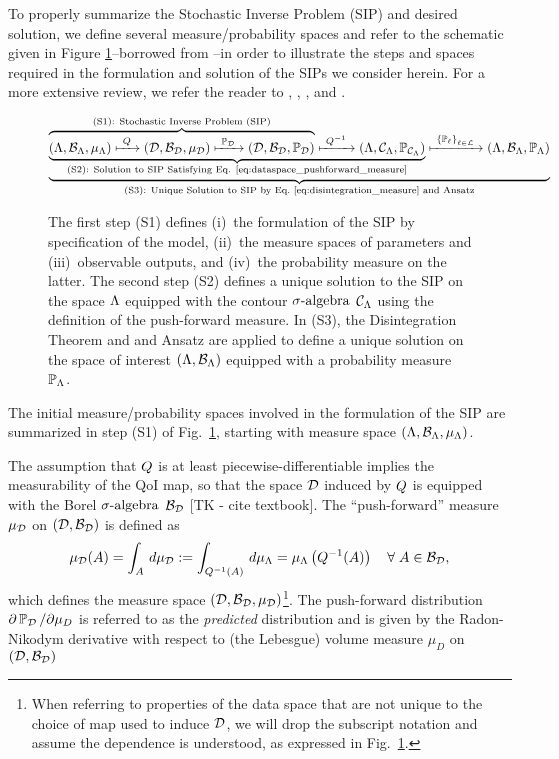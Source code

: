 To properly summarize the Stochastic Inverse Problem (SIP) and desired solution, we define several measure/probability spaces and refer to the schematic given in Figure \ref{fig:scheme}\---borrowed from \cite{BM17}\---in order to illustrate the steps and spaces required in the formulation and solution of the SIPs we consider herein.
For a more extensive review, we refer the reader to \cite{BBE11}, \cite{BES12}, \cite{BET+14}, and \cite{BM17}.

\begin{figure}[!h]
\begin{equation}
\underbrace{
\underbrace{
\overbrace{
 ({\Lambda}, \mathcal{B}_{{\Lambda}}, \mu_{{\Lambda}}) \xmapsto{\  Q\ } (\mathcal{D}, \mathcal{B}_{\mathcal{D}}, \mu_{\mathcal{D}})
  \xmapsto{\ \operatorname*{\mathbb{P}_{\mathcal{D}}}\ } (\mathcal{D}, \mathcal{B}_{\mathcal{D}}, \operatorname*{\mathbb{P}_{\mathcal{D}}})
 }^{
 \text{(S1): Stochastic Inverse Problem (SIP)}
 }
 \xmapsto{\ Q^{-1} \ } ({\Lambda}, \mathcal{C}_{{\Lambda}}, \operatorname*{\mathbb{P}_{\mathcal{C}_{{\Lambda}}}})
 }_{
 \text{(S2): Solution to SIP Satisfying Eq. \eqref{eq:dataspace_pushforward_measure}}}
 \xmapsto{\ \left\{\mathbb{P}_\ell\right\}_{\ell\in\mathcal{L}} \ } ({\Lambda}, \mathcal{B}_{{\Lambda}}, \operatorname*{\mathbb{P}_{{\Lambda}}})
 }
 _{
 \text{(S3): Unique Solution to SIP by Eq.~\eqref{eq:disintegration_measure} and Ansatz}
 }
\end{equation}
\caption{The first step (S1) defines (i)~the formulation of the SIP by specification of the model, (ii)~the measure spaces of parameters and (iii)~observable outputs, and (iv)~the probability measure on the latter. The second step (S2) defines a unique solution to the SIP on the space ${\Lambda}$ equipped with the contour $\sigma\text{-algebra}$ $\mathcal{C}_{{\Lambda}}$ using the definition of the push-forward measure. In (S3), the Disintegration Theorem and and Ansatz are applied to define a unique solution on the space of interest $({\Lambda}, \mathcal{B}_{{\Lambda}})$ equipped with a probability measure $\operatorname*{\mathbb{P}_{{\Lambda}}}$.}
\label{fig:scheme}
\end{figure}


The initial measure/probability spaces involved in the formulation of the SIP are summarized in step (S1) of Fig.~\ref{fig:scheme}, starting with measure space $({\Lambda}, \mathcal{B}_{{\Lambda}}, \mu_{{\Lambda}})$.

The assumption that $Q$ is at least piecewise-differentiable implies the measurability of the QoI map, so that the space $\mathcal{D}$ induced by $Q$ is equipped with the Borel $\sigma\text{-algebra}$ $\mathcal{B}_{\mathcal{D}}$ [TK - cite textbook].
The ``push-forward'' measure $\mu_{\mathcal{D}}$ on ${(\mathcal{D}, \mathcal{B}_{\mathcal{D}})}$ is defined as
\begin{equation}\label{eq:dataspace_pushforward_measure}
\mu_{\mathcal{D}} (A) = \int_A \, d\mu_{\mathcal{D}} := \int_{Q^{-1}(A)} \, d\mu_{{\Lambda}} = \mu_{{\Lambda}} \left (Q^{-1}(A) \right ) \quad \forall \;  A\in\mathcal{B}_{\mathcal{D}},
\end{equation}
which defines the measure space $(\mathcal{D}, \mathcal{B}_{\mathcal{D}}, \mu_{\mathcal{D}})$\footnote{When referring to properties of the data space that are not unique to the choice of map used to induce $\mathcal{D}$, we will drop the subscript notation and assume the dependence is understood, as expressed in Fig.~\ref{fig:scheme}.}.
The push-forward distribution $\partial \operatorname*{\mathbb{P}_{\mathcal{D}}} / \partial \mu_D$ is referred to as the \emph{predicted} distribution and is given by the Radon-Nikodym derivative with respect to (the Lebesgue) volume measure $\mu_D$ on ${(\mathcal{D}, \mathcal{B}_{\mathcal{D}})}$

